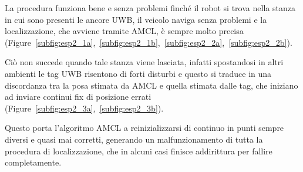 La procedura funziona bene e senza problemi finché il robot si trova nella stanza in cui sono presenti le ancore UWB, il veicolo naviga senza problemi e la localizzazione, che avviene tramite AMCL, è sempre molto precisa (Figure~\ref{subfig:esp2_1a},~\ref{subfig:esp2_1b},~\ref{subfig:esp2_2a},~\ref{subfig:esp2_2b}).  

Ciò non succede quando tale stanza viene lasciata, infatti spostandosi in altri ambienti le tag UWB risentono di forti disturbi e questo si traduce in una discordanza tra la posa stimata da AMCL e quella stimata dalle tag, che iniziano ad inviare continui fix di posizione errati (Figure~\ref{subfig:esp2_3a},~\ref{subfig:esp2_3b}).

Questo porta l'algoritmo AMCL a reinizializzarsi di continuo in punti sempre diversi e quasi mai corretti, generando un malfunzionamento di tutta la procedura di localizzazione, che in alcuni casi finisce addirittura per fallire completamente.



